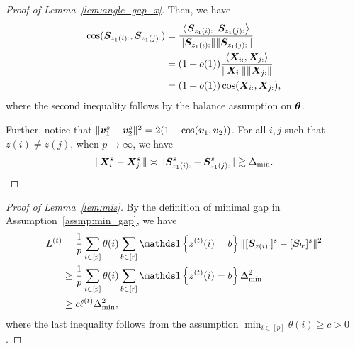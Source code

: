 \documentclass[journal]{IEEEtran}
\theoremstyle{definition}
\theoremstyle{definition}
\newcommand{\offf}[1]{\left\{#1\right\}}
\newcommand{\ang}[1]{\left\langle#1\right\rangle}
\begin{document}
\begin{proof}[Proof of Lemma~\ref{lem:angle_gap_x}]
{
 Then, we have 
\begin{align}
    \cos (\mS_{z_1(i):}, \mS_{z_1(j):}) &= \frac{ \ang{  \mS_{z_1(i):}, \mS_{z_1(j):} }}{ \onormSize{}{\mS_{z_1(i):}} \onormSize{}{\mS_{z_1(j):}} } \\
    &= (1+o(1))\frac{ \ang{  \mX_{i:}, \mX_{j:} }}{ \onormSize{}{ \mX_{i:}} \onormSize{}{ \mX_{j:}} }\\
    &= (1 + o(1)) \cos(\mX_{i:}, \mX_{j:}),
\end{align}
where the second inequality follows by the balance assumption on $\boldsymbol{\theta}$.

Further, notice that $\lVert\bm{v}_1^s - \bm{v}_2^s\rVert^2 =  2(1 - \cos(\bm{v}_1, \bm{v}_2))$. For all $i,j$ such that $z(i) \neq z(j)$, when $p \rightarrow \infty$, we have
\begin{equation}
    \lVert\bm X_{i:}^s - \bm X_{j:}^s\rVert \asymp \lVert\bm S_{z_1(i):}^s - \bm S_{z_1(j):}^s\rVert \gtrsim  \Delta_{\min}.
\end{equation} 


}



\end{proof}

\begin{proof}[Proof of Lemma~\ref{lem:mis}]
By the definition of minimal gap in Assumption~\ref{assmp:min_gap}, we have 
\begin{align}
     L^{(t)} &= \frac{1}{p}  \sum_{i \in [p]} \theta(i) \sum_{b \in [r]}  \ind \offf{ z^{(t)}(i) = b } \onormSize{}{ [ \mS_{ z(i):}  ]^s - [ \mS_{b:}  ]^s  }^2 \\
     &\geq \frac{1}{p}  \sum_{i \in [p]} \theta(i) \sum_{b \in [r]}  \ind \offf{ z^{(t)}(i) = b } \Delta_{\min}^2 \\
     & \geq c \ell^{(t)} \Delta_{\min}^2,
\end{align}
    where the last inequality follows from the assumption $\min_{i \in [p]} \theta(i) \geq c>0$.
\end{proof}
\end{document}
